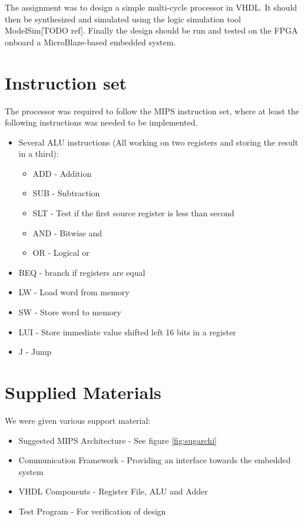 The assignment was to design a simple multi-cycle processor in VHDL.
It should then be synthesized and simulated using the logic simulation tool ModelSim[TODO ref].
Finally the design should be run and tested on the FPGA onboard a MicroBlaze-based embedded system.

\section{Instruction set}
The processor was required to follow the MIPS instruction set,
where at least the following instructions was needed to be implemented.
\begin{itemize}
    \item Several ALU instructions (All working on two registers and storing the result in a third):
        \begin{itemize}
            \item ADD - Addition
            \item SUB - Subtraction
            \item SLT - Test if the first source register is less than second
            \item AND - Bitwise and
            \item OR  - Logical or
        \end{itemize}
    \item BEQ - branch if registers are equal
    \item LW - Load word from memory
    \item SW - Store word to memory
    \item LUI - Store immediate value shifted left 16 bits in a register
    \item J - Jump
\end{itemize}

\section{Supplied Materials}
We were given various support material:
\begin{itemize}
    \item Suggested MIPS Architecture - See figure \ref{fig:sugarchi}
    \item Communication Framework - Providing an interface towards the embedded system
    \item VHDL Components - Register File, ALU and Adder
    \item Test Program - For verification of design
\end{itemize}

